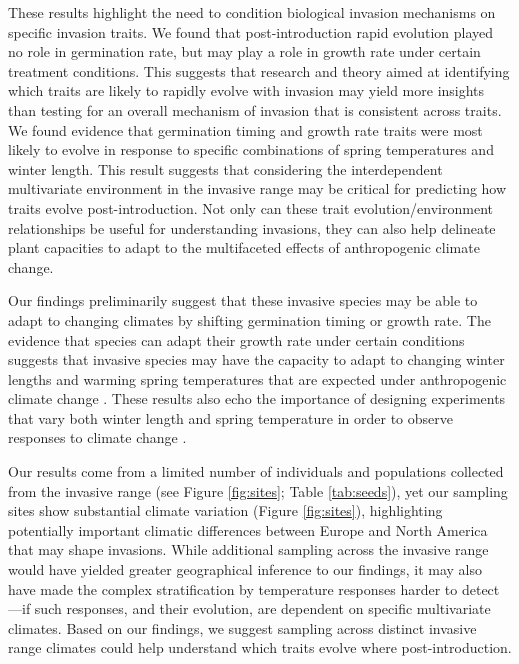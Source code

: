 \documentclass[12pt]{article}\usepackage[]{graphicx}\usepackage[]{color}
\begin{document}
	These results highlight the need to condition biological invasion mechanisms on specific invasion traits. We found that post-introduction rapid evolution played no role in germination rate, but may play a role in growth rate under certain treatment conditions. This suggests that research and theory aimed at identifying which traits are likely to rapidly evolve with invasion may yield more insights than testing for an overall mechanism of invasion that is consistent across traits. We found evidence that germination timing and growth rate traits were most likely to evolve in response to specific combinations of spring temperatures and winter length. This result suggests that considering the interdependent multivariate environment in the invasive range may be critical for predicting how traits evolve post-introduction. 
Not only can these trait evolution/environment relationships be useful for understanding invasions, they can also help delineate plant capacities to adapt to the multifaceted effects of anthropogenic climate change. 
	
	Our findings preliminarily suggest that these invasive species may be able to adapt to changing climates by shifting germination timing or growth rate. The evidence that species can adapt their growth rate under certain conditions suggests that invasive species may have the capacity to adapt to changing winter lengths and warming spring temperatures that are expected under anthropogenic climate change \parencite{IPCC2015}. These results also echo the  importance of designing experiments that vary both winter length and spring temperature in order to observe responses to climate change \parencite[e.g.,][]{Bernareggi2016}. 

	Our results come from a limited number of individuals and populations collected from the invasive range (see Figure \ref{fig:sites}; Table \ref{tab:seeds}), yet our sampling sites show substantial climate variation (Figure \ref{fig:sites}), highlighting potentially important climatic differences between Europe and North America that may shape invasions. While additional sampling across the invasive range would have yielded greater geographical inference to our findings, it may also have made the complex stratification by temperature responses harder to detect---if such responses, and their evolution, are dependent on specific multivariate climates. Based on our findings, we suggest sampling across distinct invasive range climates could help understand which traits evolve where post-introduction. %
\end{document}
